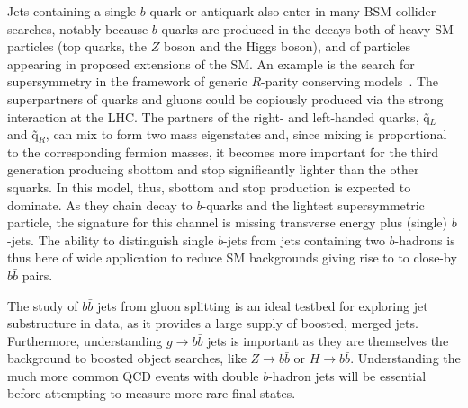 Jets containing a single $b$-quark or antiquark %
also enter in many BSM collider searches, notably because $b$-quarks are produced in the decays both of heavy SM particles (top quarks, the $Z$ boson and the Higgs boson), and of particles appearing in proposed extensions of the SM.  %
 An example is the search for supersymmetry in the framework of generic $R$-parity conserving models~\cite{ATLAS-CONF-2011-098}. The superpartners of quarks and gluons could be copiously produced via the strong interaction at the LHC. The partners of the right- and left-handed quarks, \~{q}$_{L}$ and  \~{q}$_{R}$, can mix to form two mass eigenstates and, since mixing is proportional to the corresponding fermion masses, it becomes more important for the third generation producing sbottom and stop significantly lighter than the other squarks. In this model, thus, sbottom and stop production is expected to dominate. As they chain decay to $b$-quarks and the lightest supersymmetric particle, the signature for this channel is missing transverse energy %
plus (single) $b$-jets. The ability to distinguish single $b$-jets from jets containing two $b$-hadrons is thus here of wide application to reduce SM backgrounds giving rise to  to close-by $b\bar{b}$ pairs. %



   The study of $b\bar{b}$ jets from gluon splitting is an ideal testbed for exploring jet substructure in data, as it provides a large supply of boosted, merged jets. Furthermore, understanding $g\rightarrow b \bar{b}$ jets is important as they are themselves the background to boosted object searches, like $Z\rightarrow b\bar{b}$ or $H\rightarrow b \bar{b}$.  %
Understanding the much more common QCD events with double $b$-hadron jets will be essential before attempting to measure more rare final states.


